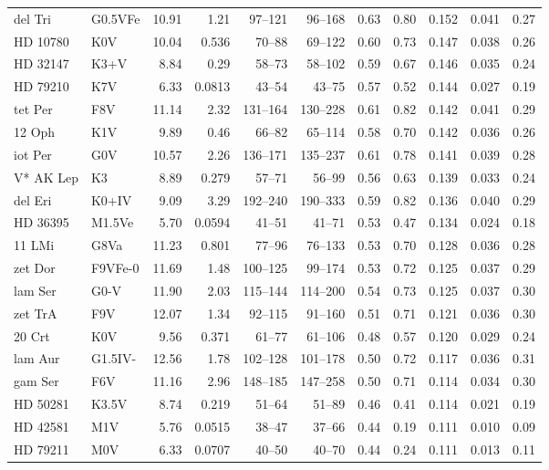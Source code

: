 \documentclass[11pt,a4paper]{article}
\begin{document}
{\begin{longtable}{llrrrrrrrrr}
del Tri & G0.5VFe & 10.91 & 1.21 & 97--121 & 96--168 & 0.63 & 0.80 & 0.152 & 0.041 & 0.27 \\
HD  10780 & K0V & 10.04 & 0.536 & 70--88 & 69--122 & 0.60 & 0.73 & 0.147 & 0.038 & 0.26 \\
HD  32147 & K3+V & 8.84 & 0.29 & 58--73 & 58--102 & 0.59 & 0.67 & 0.146 & 0.035 & 0.24 \\
HD  79210 & K7V & 6.33 & 0.0813 & 43--54 & 43--75 & 0.57 & 0.52 & 0.144 & 0.027 & 0.19 \\
tet Per & F8V & 11.14 & 2.32 & 131--164 & 130--228 & 0.61 & 0.82 & 0.142 & 0.041 & 0.29 \\
12 Oph & K1V & 9.89 & 0.46 & 66--82 & 65--114 & 0.58 & 0.70 & 0.142 & 0.036 & 0.26 \\
iot Per & G0V & 10.57 & 2.26 & 136--171 & 135--237 & 0.61 & 0.78 & 0.141 & 0.039 & 0.28 \\
V* AK Lep & K3 & 8.89 & 0.279 & 57--71 & 56--99 & 0.56 & 0.63 & 0.139 & 0.033 & 0.24 \\
del Eri & K0+IV & 9.09 & 3.29 & 192--240 & 190--333 & 0.59 & 0.82 & 0.136 & 0.040 & 0.29 \\
HD  36395 & M1.5Ve & 5.70 & 0.0594 & 41--51 & 41--71 & 0.53 & 0.47 & 0.134 & 0.024 & 0.18 \\
11 LMi & G8Va & 11.23 & 0.801 & 77--96 & 76--133 & 0.53 & 0.70 & 0.128 & 0.036 & 0.28 \\
zet Dor & F9VFe-0 & 11.69 & 1.48 & 100--125 & 99--174 & 0.53 & 0.72 & 0.125 & 0.037 & 0.29 \\
lam Ser & G0-V & 11.90 & 2.03 & 115--144 & 114--200 & 0.54 & 0.73 & 0.125 & 0.037 & 0.30 \\
zet TrA & F9V & 12.07 & 1.34 & 92--115 & 91--160 & 0.51 & 0.71 & 0.121 & 0.036 & 0.30 \\
20 Crt & K0V & 9.56 & 0.371 & 61--77 & 61--106 & 0.48 & 0.57 & 0.120 & 0.029 & 0.24 \\
lam Aur & G1.5IV- & 12.56 & 1.78 & 102--128 & 101--178 & 0.50 & 0.72 & 0.117 & 0.036 & 0.31 \\
gam Ser & F6V & 11.16 & 2.96 & 148--185 & 147--258 & 0.50 & 0.71 & 0.114 & 0.034 & 0.30 \\
HD  50281 & K3.5V & 8.74 & 0.219 & 51--64 & 51--89 & 0.46 & 0.41 & 0.114 & 0.021 & 0.19 \\
HD  42581 & M1V & 5.76 & 0.0515 & 38--47 & 37--66 & 0.44 & 0.19 & 0.111 & 0.010 & 0.09 \\
HD  79211 & M0V & 6.33 & 0.0707 & 40--50 & 40--70 & 0.44 & 0.24 & 0.111 & 0.013 & 0.11 \\

\end{longtable}}
\end{document}
